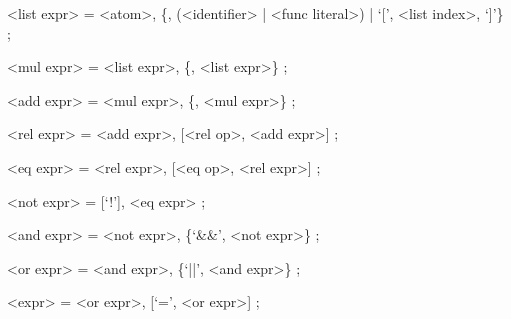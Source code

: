 \documentclass{article}
\begin{document}
	\begin{grammar}
		<list expr> = <atom>, \{<pipe op>,
					  (<identifier> | <func literal>)
					  | `[', <list index>, `]'\} ;

		<mul expr> = <list expr>, \{<mul op>, <list expr>\} ;

		<add expr> = <mul expr>, \{<add op>, <mul expr>\} ;

		<rel expr> = <add expr>, [<rel op>, <add expr>] ;

		<eq expr> = <rel expr>, [<eq op>, <rel expr>] ;

		<not expr> = [`!'], <eq expr> ;

		<and expr> = <not expr>, \{`&&', <not expr>\} ;

		<or expr> = <and expr>, \{`||', <and expr>\} ;

		<expr> = <or expr>, [`=', <or expr>] ;
	\end{grammar}
\end{document}
